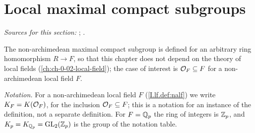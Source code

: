 \section{Local maximal compact subgroups}\label{sec:conv-max-compact}

\noindent\emph{Sources for this section:} \cite[§9.1]{Cas-p}; \cite[§9]{BumpH}.

The non-archimedean maximal compact subgroup is defined for an arbitrary ring homomorphism $R\to F$, so that this
chapter does not depend on the theory of local fields (\cref{ch:ch-0-02-local-field}); the case of interest is
$\mathcal{O}_F\subseteq F$ for a non-archimedean local field $F$.

\begin{definition}
\end{definition}
\noindent\emph{Notation.} For a non-archimedean local field $F$ (\cref{I.lf.def:nalf}) we write
$K_F=K(\mathcal{O}_F)$, for the inclusion $\mathcal{O}_F\subseteq F$; this is a notation for an instance of the definition, not
a separate definition. For $F=\mathbb{Q}_p$ the ring of integers is $\mathbb{Z}_p$, and $K_p=K_{\mathbb{Q}_p}=\mathrm{GL}_2(\mathbb{Z}_p)$ is the group of the notation table.

